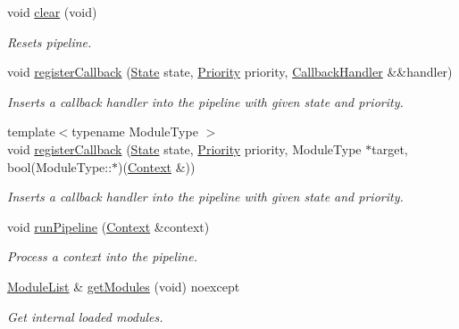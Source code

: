 \begin{DoxyCompactItemize}
void \mbox{\hyperlink{classo_z_1_1_pipeline_a7ba573fcba5ea0a749ca1c214bd031f5}{clear}} (void)
\begin{DoxyCompactList}\small\item\em Resets pipeline. \end{DoxyCompactList}\item 
void \mbox{\hyperlink{classo_z_1_1_pipeline_a869b02b2b8953993ccfb882a3e1f3a0f}{register\+Callback}} (\mbox{\hyperlink{namespaceo_z_a356b278f7c65def0cae75fca8cae268e}{State}} state, \mbox{\hyperlink{namespaceo_z_af05a92eb185d18369e9b4acdcd9dcd12}{Priority}} priority, \mbox{\hyperlink{classo_z_1_1_pipeline_a5a71ea2f2d4be5b82589c1b8175722f4}{Callback\+Handler}} \&\&handler)
\begin{DoxyCompactList}\small\item\em Inserts a callback handler into the pipeline with given state and priority. \end{DoxyCompactList}\item 
{\footnotesize template$<$typename Module\+Type $>$ }\\void \mbox{\hyperlink{classo_z_1_1_pipeline_af6d96b2697aa6770a3f1dd205b12c1c3}{register\+Callback}} (\mbox{\hyperlink{namespaceo_z_a356b278f7c65def0cae75fca8cae268e}{State}} state, \mbox{\hyperlink{namespaceo_z_af05a92eb185d18369e9b4acdcd9dcd12}{Priority}} priority, Module\+Type $\ast$target, bool(Module\+Type\+::$\ast$)(\mbox{\hyperlink{classo_z_1_1_context}{Context}} \&))
\begin{DoxyCompactList}\small\item\em Inserts a callback handler into the pipeline with given state and priority. \end{DoxyCompactList}\item 
void \mbox{\hyperlink{classo_z_1_1_pipeline_a90bddc5511acce66f2aa780c3bba29b4}{run\+Pipeline}} (\mbox{\hyperlink{classo_z_1_1_context}{Context}} \&context)
\begin{DoxyCompactList}\small\item\em Process a context into the pipeline. \end{DoxyCompactList}\item 
\mbox{\hyperlink{classo_z_1_1_pipeline_a3bb478d291a83763b269d8d27e186a47}{Module\+List}} \& \mbox{\hyperlink{classo_z_1_1_pipeline_a3886c29b903d2e359a853ea76711661b}{get\+Modules}} (void) noexcept
\begin{DoxyCompactList}\small\item\em Get internal loaded modules. \end{DoxyCompactList}\item 

\end{DoxyCompactItemize}
